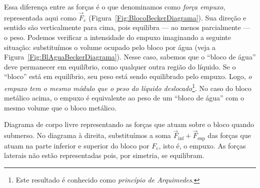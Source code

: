 Essa diferença entre as forças é o que denominamos como \emph{força empuxo}, representada aqui como $\vec{F}_e$ (Figura~\ref{Fig:BlocoBeckerDiagrama}). Sua direção e sentido são verticalmente para cima, pois equilibra --- ao menos parcialmente --- o peso. Podemos verificar a intensidade do empuxo  imaginando a seguinte situação: substituímos o volume ocupado pelo bloco por água (veja a Figura~\ref{Fig:BlAguaBeckerDiagrama}). Nesse caso, sabemos que o ``bloco de água'' deve permanecer em equilíbrio, como qualquer outra região do líquido. Se o ``bloco'' está em equilíbrio, seu peso está sendo equilibrado pelo empuxo. Logo, \emph{o empuxo tem o mesmo módulo que o peso do líquido deslocado}\footnote{Este resultado é conhecido como \emph{princípio de Arquimedes}.}. No caso do bloco metálico acima, o empuxo é equivalente ao peso de um ``bloco de água'' com o mesmo volume que o bloco metálico.

\begin{marginfigure}
\centering
{}
\caption{Diagrama de corpo livre representando as forças que atuam sobre o bloco quando submerso. No diagrama à direita, substituímos a soma $\vec{F}_{\textrm{inf}} + \vec{F}_{\textrm{sup}}$ das forças que atuam na parte inferior e superior do bloco por $F_e$, isto é, o empuxo. As forças laterais não estão representadas pois, por simetria, se equilibram.}
\label{Fig:BlocoBeckerDiagrama}
\end{marginfigure}

